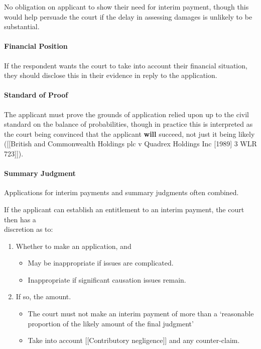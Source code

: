 \documentclass[
]{article}
\providecommand{\tightlist}{%
  \setlength{\itemsep}{0pt}\setlength{\parskip}{0pt}}
\begin{document}
No obligation on applicant to show their need for interim payment,
though this would help persuade the court if the delay in assessing
damages is unlikely to be substantial.

\hypertarget{financial-position}{%
\paragraph{Financial Position}\label{financial-position}}

If the respondent wants the court to take into account their financial
situation, they should disclose this in their evidence in reply to the
application.

\hypertarget{standard-of-proof}{%
\paragraph{Standard of Proof}\label{standard-of-proof}}

The applicant must prove the grounds of application relied upon up to
the civil standard on the balance of probabilities, though in practice
this is interpreted as the court being convinced that the applicant
\textbf{will} succeed, not just it being likely ({[}{[}British and
Commonwealth Holdings plc v Quadrex Holdings Inc {[}1989{]} 3 WLR
723{]}{]}).

\hypertarget{summary-judgment}{%
\paragraph{Summary Judgment}\label{summary-judgment}}

Applications for interim payments and summary judgments often combined.

If the applicant can establish an entitlement to an interim payment, the
court then has a\\
discretion as to:

\begin{enumerate}
\def\labelenumi{\arabic{enumi}.}
\tightlist
\item
  Whether to make an application, and

  \begin{itemize}
  \tightlist
  \item
    May be inappropriate if issues are complicated.
  \item
    Inappropriate if significant causation issues remain.
  \end{itemize}
\item
  If so, the amount.

  \begin{itemize}
  \tightlist
  \item
    The court must not make an interim payment of more than a
    `reasonable proportion of the likely amount of the final judgment'
  \item
    Take into account {[}{[}Contributory negligence{]}{]} and any
    counter-claim.
  \end{itemize}
\end{enumerate}
\end{document}
